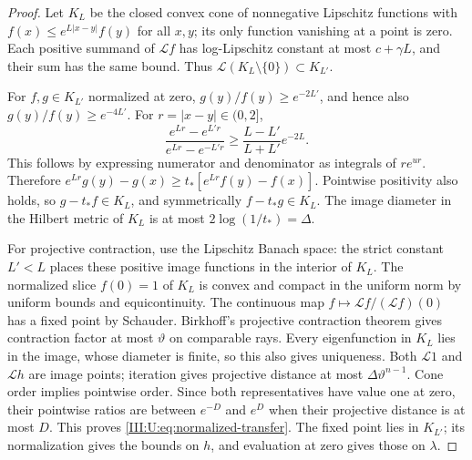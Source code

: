 \begin{proof}
Let $K_L$ be the closed convex cone of nonnegative Lipschitz functions
with $f(x)\le e^{L|x-y|}f(y)$ for all $x,y$; its only function
vanishing at a point is zero. Each positive summand of $\mathcal L f$
has log-Lipschitz constant at most $c+\gamma L$, and their sum has
the same bound. Thus $\mathcal L(K_L\setminus\{0\})\subset K_{L'}$.

For $f,g\in K_{L'}$ normalized at zero, $g(y)/f(y)\ge e^{-2L'}$,
and hence also $g(y)/f(y)\ge e^{-4L'}$. For $r=|x-y|\in(0,2]$,
\[
 \frac{e^{Lr}-e^{L'r}}{e^{Lr}-e^{-L'r}}
 \ge\frac{L-L'}{L+L'}e^{-2L}.
\]
This follows by expressing numerator and denominator as integrals
of $r e^{ur}$. Therefore
$e^{Lr}g(y)-g(x)\ge
t_*[e^{Lr}f(y)-f(x)]$. Pointwise positivity also holds, so
$g-t_*f\in K_L$, and symmetrically $f-t_*g\in K_L$.
The image diameter in the Hilbert metric of $K_L$ is at most
$2\log(1/t_*)=\Delta$.

For projective contraction, use the Lipschitz Banach space: the strict
constant $L'<L$ places these positive image functions in the interior
of $K_L$. The normalized slice $f(0)=1$ of $K_L$ is convex and compact in the
uniform norm by uniform bounds and equicontinuity. The continuous
map $f\mapsto\mathcal L f/(\mathcal L f)(0)$ has a fixed point
by Schauder. Birkhoff's projective contraction theorem
\citep{gaubert2015} gives contraction factor at most $\vartheta$ on
comparable rays. Every eigenfunction in $K_L$ lies in the image,
whose diameter is finite, so this also gives uniqueness.
Both $\mathcal L1$ and $\mathcal Lh$ are image points; iteration
gives projective distance at most $\Delta\vartheta^{n-1}$.
Cone order implies pointwise order. Since both representatives have
value one at zero, their pointwise ratios are between $e^{-D}$ and
$e^D$ when their projective distance is at most $D$. This proves
\eqref{III:U:eq:normalized-transfer}. The fixed point lies in $K_{L'}$;
its normalization gives the bounds on $h$, and evaluation at zero
gives those on $\lambda$.
\end{proof}
